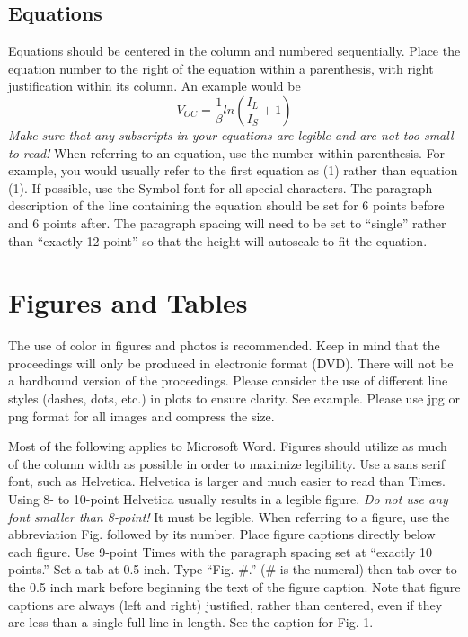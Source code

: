 \documentclass[conference]{pvsctran}
\begin{document}
\subsection{ Equations }
Equations should be centered in the column and numbered sequentially. Place the equation number to the right of the equation within a parenthesis, with right justification within its column. An example would be
\begin{equation}
V_{OC}=\frac{1}{\beta}ln\left(\frac{I_L}{I_S}+1\right)
\end{equation}
\emph{Make sure that any subscripts in your equations are legible and are not too
small to read!} When referring to an equation, use the number within
parenthesis. For example, you would usually refer to the first
equation as (1) rather than equation (1). If possible, use the Symbol
font for all special characters.%
The paragraph description of the line containing the
equation should be set for 6 points before and 6 points after. The
paragraph spacing will need to be set to ``single'' rather than ``exactly
12 point'' so that the height will autoscale to fit the equation.

\section{Figures and Tables}
The use of color in figures and photos is recommended.  Keep in mind that the proceedings will only be produced in electronic format (DVD).  There will not be a hardbound version of the proceedings.  Please consider the use of different line styles (dashes, dots, etc.) in plots to ensure clarity.  See example.  Please use jpg or png format for all images and compress the size.

Most of the following applies to Microsoft Word.  Figures should utilize as much of the column width as possible in order to maximize legibility. Use a sans serif font, such as Helvetica. Helvetica is larger and much easier to read than Times. Using 8- to 10-point Helvetica usually results in a legible figure. \emph{Do not use any font smaller than 8-point!} It must be legible. When referring to a figure, use the abbreviation Fig. followed by its number. Place figure captions directly below each figure. Use
9-point Times with the paragraph spacing set at ``exactly 10 points.'' Set a tab at 0.5 inch. Type ``Fig. \#.'' (\# is the numeral) then tab over to the 0.5 inch mark before beginning the text of the figure caption. Note that figure captions are always (left and right) justified, rather than centered, even if they are less than a single full line in length. See the caption for Fig. 1.
\end{document}
